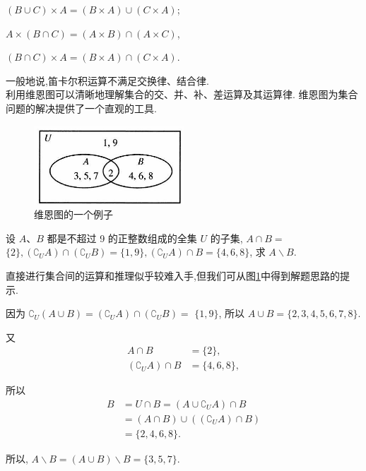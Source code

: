 $(B \cup C) \times A=(B \times A) \cup(C \times A)$;

$A \times(B \cap C)=(A \times B) \cap(A \times C)$,

$(B \cap C) \times A=(B \times A) \cap(C \times A)$.

一般地说,笛卡尔积运算不满足交换律、结合律.\\
利用维恩图可以清晰地理解集合的交、并、补、差运算及其运算律. 维恩图为集合问题的解决提供了一个直观的工具.
\begin{figure}[ht]
	\centering
	\includegraphics[width=0.5\textwidth]{images/2024_05_17_3b020e8fe1313185a92eg-014.jpg}
	\caption{维恩图的一个例子}
	\label{fig:Venn}
\end{figure}

\begin{example}
	设 $A 、 B$ 都是不超过 9 的正整数组成的全集 $U$ 的子集, $A \cap B=$ $\{2\},\left(\complement_{U} A\right) \cap\left(\complement_{U} B\right)=\{1,9\},\left(\complement_{U} A\right) \cap B=\{4,6,8\}$, 求 $A \backslash B$.
\end{example}

\begin{analysis}
	直接进行集合间的运算和推理似乎较难入手,但我们可从图\ref{fig:Venn}中得到解题思路的提示.
\end{analysis}

\begin{solution}
	因为 $\complement_{U}(A \cup B)=\left(\complement_{U} A\right) \cap\left(\complement_{U} B\right)=$ $\{1,9\}$, 所以 $A \cup B=\{2,3,4,5,6,7,8\}$.

	又
	$$
		\begin{aligned}
			A \cap B                              & =\{2\},     \\
			\left(\complement_{U} A\right) \cap B & =\{4,6,8\},
		\end{aligned}
	$$




	所以
	$$
		\begin{aligned}
			B & =U \cap B=\left(A \cup \complement_{U} A\right) \cap B             \\
			  & =(A \cap B) \cup\left(\left(\complement_{U} A\right) \cap B\right) \\
			  & =\{2,4,6,8\} .
		\end{aligned}
	$$

	所以, $A \backslash B=(A \cup B) \backslash B=\{3,5,7\}$.

\end{solution}

